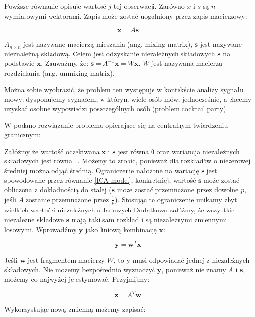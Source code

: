 \documentclass[oneside, eng]{mgr}
\newcommand{\bb}{\textbf}
\begin{document}
Powższe równanie opisuje wartość $j$-tej obserwacji. Zarówno $x$ i $s$ są $n$-wymiarowymi wektorami. Zapis może zostać uogólniony przez zapis macierzowy:

\begin{equation}
	\bb{x} = A \bb{s}
	\label{ICA model}
\end{equation}

$A_{n \times n}$ jest nazywane macierzą mieszania (ang. mixing matrix), $\bb{s}$ jest nazywane nieznależną składową. Celem jest odzyskanie niezależnych składowych $\bb{s}$ na podstawie $\bb{x}$. Zauważmy, że: $\bb{s} = A^{-1}\bb{x} = W \bb{x}$. $W$ jest nazywana macierzą rozdzielania (ang. unmixing matrix). 

Można sobie wyobrazić, że problem ten występuje w kontekście analizy sygnału mowy: dysponujemy sygnałem, w którym wiele osób mówi jednocześnie, a chcemy uzyskać osobne wypowiedzi poszczególnych osób (problem cocktail party). 

W \cite{ICA} podano rozwiązanie problemu opierające się na centralnym twierdzeniu granicznym:

Załóżmy że wartość oczekiwana $\bb{x}$ i $\bb{s}$ jest równa 0 oraz wariancja niezależnych składowych jest równa 1. Możemy to zrobić, ponieważ dla rozkładów o niezerowej średniej można odjąć średnią. Ograniczenie nałożone na wariację $\bb{s}$ jest spowodowane przez równanie \ref{ICA model}, konkretniej, wartość $\bb{s}$ może zostać obliczona z dokładnością do stałej ($\bb{s}$ może zostać przemnożone przez dowolne $p$, jeśli $A$ zostanie przemnożone przez $\frac{1}{p}$). Stosując to ograniczenie unikamy zbyt wielkich wartości niezależnych składowych  Dodatkowo załóżmy, że wszystkie niezależne składowe $\bb{s}$ mają taki sam rozkład i są niezależnymi zmiennymi losowymi. Wprowadźmy $\bb{y}$ jako liniową kombinację $\bb{x}$:

\begin{equation}
	\bb{y} = \bb{w}^T \bb{x}
\end{equation}

Jeśli $\bb{w}$ jest fragmentem macierzy $W$, to $\bb{y}$ musi odpowiadać jednej z niezależnych składowych. Nie możemy bezpośrednio wyznaczyć $\bb{y}$, ponieważ nie znamy $A$ i $\bb{s}$, możemy co najwyżej je estymować. Przyjmijmy:

\begin{equation}
	\bb{z} = A^T \bb{w}
\end{equation}

Wykorzystując nową zmienną możemy zapisać:
\end{document}
